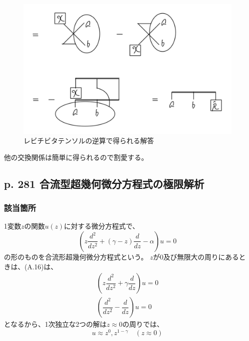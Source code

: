 \documentclass{jsarticle}
\begin{document}
\begin{figure}
    \centering
    \includegraphics{Rhat-solution.png}
    \caption[]{レビチビタテンソルの逆算で得られる解答}
    \label{fig:Rhat solution}
\end{figure}

他の交換関係は簡単に得られるので割愛する。


\subsection*{p. 281 合流型超幾何微分方程式の極限解析}

\subsubsection*{該当箇所}
1変数$z$の関数$u(z)$に対する微分方程式で、
\begin{equation}
    \tag{A.16}
    \left(
        z\dfrac{d^2}{dz^2}
        +
        (\gamma-z)\dfrac{d}{dz}
        -
        \alpha
    \right)
    u=0
\end{equation}
の形のものを合流形超幾何微分方程式という。
$z$が$0$及び無限大の周りにあるときは、(A.16)は、
\begin{eqnarray}
    \tag{A.17a}
    \left(
        z\dfrac{d^2}{dz^2}
        +
        \gamma\dfrac{d}{dz}
    \right)
    u=0
    \\
    \tag{A.17b}
    \left(
        \dfrac{d^2}{dz^2}
        -
        \dfrac{d}{dz}
    \right)
    u=0
\end{eqnarray}
となるから、1次独立な2つの解は$z\approx0$の周りでは、
\begin{equation}
    \tag{A.18a}
    u\approx z^0, z^{1-\gamma}\quad(z\approx0)
\end{equation}
\end{document}
